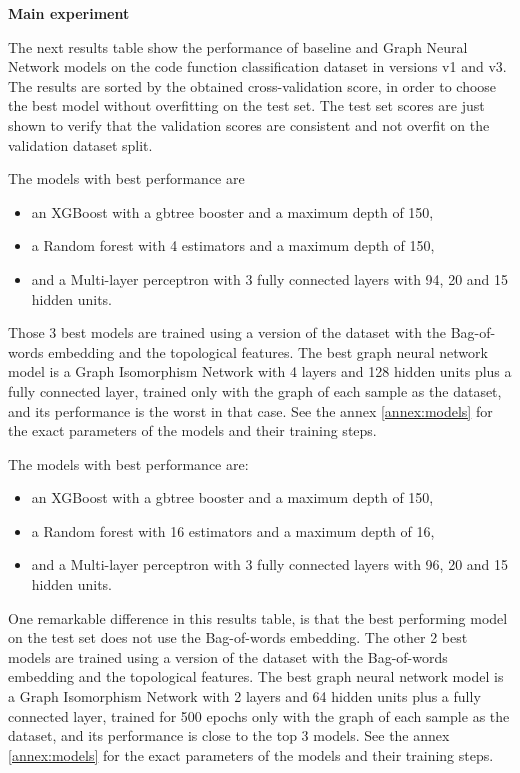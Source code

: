 \textbf{Main experiment}

The next results table show the performance of baseline  and Graph Neural Network models on the code function classification dataset in versions v1 and v3. The results are sorted by the obtained cross-validation score, in order to choose the best model without overfitting on the test set. The test set scores are just shown to verify that the validation scores are consistent and not overfit on the validation dataset split.






The models with best performance are
\begin{itemize} 
  \item an XGBoost with a gbtree booster and a maximum depth of 150, 
  \item a Random forest with 4 estimators and a maximum depth of 150, 
  \item and a Multi-layer perceptron with 3 fully connected layers with 94, 20 and 15 hidden units. 
\end{itemize}
Those 3 best models are trained using a version of the dataset with the Bag-of-words embedding and the topological features. The best graph neural network model is a Graph Isomorphism Network with 4 layers and 128 hidden units plus  a fully connected layer, trained only with the graph of each sample as the dataset, and its performance is the worst in that case. See the annex \ref{annex:models} for the exact parameters of the models and their training steps.







The models with best performance are:
\begin{itemize} 
  \item an XGBoost with a gbtree booster and a maximum depth of 150, 
  \item a Random forest with 16 estimators and a maximum depth of 16, 
  \item and a Multi-layer perceptron with 3 fully connected layers with 96, 20 and 15 hidden units. 
\end{itemize} 
One remarkable difference in this results table, is that the best performing model on the test set does not use the Bag-of-words embedding. The other 2 best models are trained using a version of the dataset with the Bag-of-words embedding and the topological features. The best graph neural network model is a Graph Isomorphism Network with 2 layers and 64 hidden units plus  a fully connected layer, trained for 500 epochs only with the graph of each sample as the dataset, and its performance is close to the top 3 models. See the annex \ref{annex:models} for the exact parameters of the models and their training steps.



